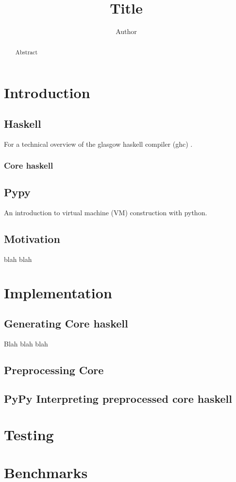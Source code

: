 \documentclass{article}
\begin{document}
\title{Title}
\author{Author}
\maketitle

\begin{abstract}
Abstract
\end{abstract}

\clearpage


\section{Introduction}

\subsection{Haskell}

For a technical overview of the glasgow haskell compiler (ghc) \cite{ghc}.

\subsubsection{Core haskell}

\subsection{Pypy}

An introduction to virtual machine (VM) construction with python\cite{pypy}.

\subsection{Motivation}

blah blah

\section{Implementation}

\subsection{Generating Core haskell}

Blah blah blah

\subsection{Preprocessing Core}


\subsection{PyPy Interpreting preprocessed core haskell}


\section{Testing}


\section{Benchmarks}





\end{document}
